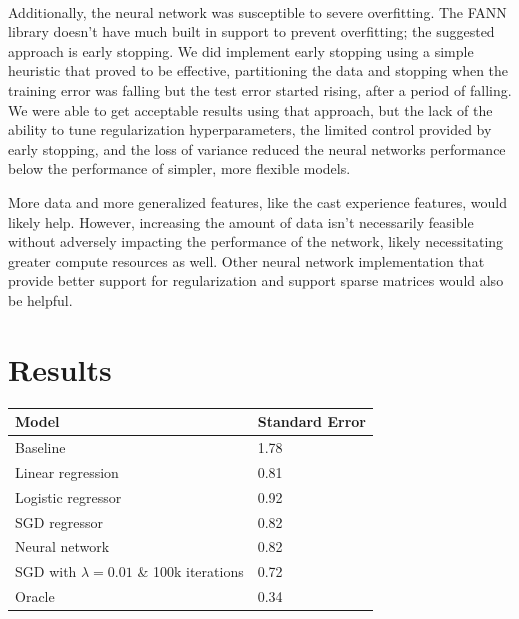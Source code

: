 \documentclass[journal]{IEEEtran}
\begin{document}
\\
\par Additionally, the neural network was susceptible to severe overfitting.  The FANN library doesn't have much built in support to prevent overfitting; the suggested approach is early stopping.  We did implement early stopping using a simple heuristic that proved to be effective, partitioning the data and stopping when the training error was falling but the test error started rising, after a period of falling.  We were able to get acceptable results using that approach, but the lack of the ability to tune regularization hyperparameters, the limited control provided by early stopping, and the loss of variance reduced the neural networks performance below the performance of simpler, more flexible models.
\\
\par More data and more generalized features, like the cast experience features, would likely help.  However, increasing the amount of data isn't necessarily feasible without adversely impacting the performance of the network, likely necessitating greater compute resources as well.  Other neural network implementation that provide better support for regularization and support sparse matrices would also be helpful.

\section{Results}
\smallskip
\begin{center}
\begin{tabular}{|l | l|} %
\hline
Model               & Standard Error  \\ [0.5ex] %
\hline
Baseline            & 1.78 \\
\hline
Linear regression  & 0.81 \\
Logistic regressor  & 0.92 \\
SGD regressor       & 0.82 \\
Neural network      & 0.82 \\
SGD with $ \lambda = 0.01 $ \& 100k iterations & 0.72 \\
\hline
Oracle              & 0.34 \\
\hline %
\end{tabular}
\end{center}
\smallskip
\end{document}
